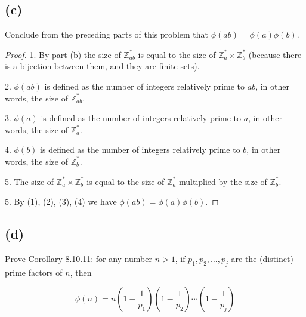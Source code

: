 \documentclass[14pt]{extarticle}
\begin{document}
\subsection{(c)}
Conclude from the preceding parts of this problem that $\phi(ab) = \phi(a)\phi(b)$.

\begin{proof}
1. By part (b) the size of $\mathbb{Z}_{ab}^*$ is equal to the size of $\mathbb{Z}_a^* \times \mathbb{Z}_b^*$ (because there is a bijection between them, and they are finite sets).

2. $\phi(ab)$ is defined as the number of integers relatively prime to $ab$, in other words, the size of $\mathbb{Z}_{ab}^*$.

3. $\phi(a)$ is defined as the number of integers relatively prime to $a$, in other words, the size of $\mathbb{Z}_{a}^*$.

4. $\phi(b)$ is defined as the number of integers relatively prime to $b$, in other words, the size of $\mathbb{Z}_{b}^*$.

5. The size of $\mathbb{Z}_a^* \times \mathbb{Z}_b^*$ is equal to the size of $\mathbb{Z}_a^*$ multiplied by the size of $\mathbb{Z}_b^*$.

5. By (1), (2), (3), (4) we have $\phi(ab) = \phi(a)\phi(b)$.
\end{proof}

\subsection{(d)}
Prove Corollary 8.10.11: for any number $n > 1$, if $p_1, p_2, \ldots, p_j$ are the (distinct) prime factors of $n$, then

$$
\phi(n) = n\left(1 - \frac{1}{p_1}\right)\left(1 - \frac{1}{p_2}\right)\cdots\left(1 - \frac{1}{p_j}\right)
$$
\end{document}
